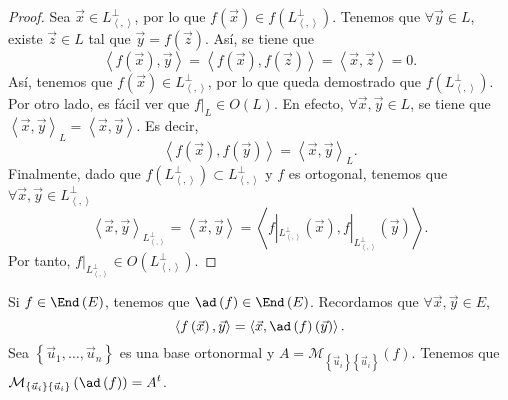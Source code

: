 \begin{proof}
Sea $\displaystyle \vec{x} \in L^{\perp }_{\left\langle ,  \right\rangle } $, por lo que $\displaystyle f\left(\vec{x}\right) \in f\left(L^{\perp }_{\left\langle ,  \right\rangle }\right) $. Tenemos que $\displaystyle \forall\vec{y} \in L $, existe $\displaystyle \vec{z} \in L $ tal que $\displaystyle \vec{y} = f\left(\vec{z}\right) $. Así, se tiene que 
\[\left\langle f\left(\vec{x}\right), \vec{y} \right\rangle = \left\langle f\left(\vec{x}\right), f\left(\vec{z}\right) \right\rangle = \left\langle \vec{x}, \vec{z} \right\rangle = 0 .\]
Así, tenemos que $\displaystyle f\left(\vec{x}\right) \in L^{\perp }_{\left\langle ,  \right\rangle } $, por lo que queda demostrado que $\displaystyle f\left(L^{\perp }_{\left\langle ,  \right\rangle }\right) $. \\
Por otro lado, es fácil ver que $\displaystyle f|_{L} \in O\left(L\right) $. En efecto, $\displaystyle \forall \vec{x}, \vec{y} \in L $, se tiene que $\displaystyle \left\langle \vec{x}, \vec{y} \right\rangle _{L} = \left\langle \vec{x}, \vec{y} \right\rangle  $. Es decir,
\[\left\langle f\left(\vec{x}\right), f\left(\vec{y}\right) \right\rangle = \left\langle \vec{x}, \vec{y} \right\rangle _{L} .\]
Finalmente, dado que $\displaystyle f\left(L^{\perp }_{\left\langle ,  \right\rangle }\right) \subset L^{\perp }_{\left\langle ,  \right\rangle } $ y $\displaystyle f $ es ortogonal, tenemos que $\displaystyle \forall\vec{x}, \vec{y} \in L^{\perp }_{\left\langle ,  \right\rangle } $ 
\[\left\langle \vec{x}, \vec{y} \right\rangle _{L^{\perp }_{\left\langle ,  \right\rangle }} = \left\langle \vec{x}, \vec{y} \right\rangle = \left\langle f|_{L^{\perp }_{\left\langle ,  \right\rangle }}\left(\vec{x}\right), f|_{L^{\perp }_{\left\langle ,  \right\rangle }}\left(\vec{y}\right) \right\rangle  .\]
Por tanto, $\displaystyle f|_{L^{\perp }_{\left\langle ,  \right\rangle }} \in O\left(L^{\perp }_{\left\langle ,  \right\rangle }\right) $.
\end{proof}
Si $\displaystyle f \in \End\left(E\right) $, tenemos que $\displaystyle \ad\left(f\right) \in \End\left(E\right) $. Recordamos que $\displaystyle \forall \vec{x}, \vec{y} \in E $,
\[\left\langle f\left(\vec{x}\right), \vec{y} \right\rangle  = \left\langle \vec{x}, \ad\left(f\right)\left(\vec{y}\right) \right\rangle  .\]
Sea $\displaystyle \left\{ \vec{u}_{1}, \ldots, \vec{u}_{n}\right\}  $ es una base ortonormal y $\displaystyle A = \mathcal{M}_{ \left\{ \vec{u}_{i}\right\} \left\{ \vec{u}_{i}\right\} }\left(f\right) $. Tenemos que $\displaystyle \mathcal{M}_{ \left\{ \vec{u}_{i}\right\} \left\{ \vec{u}_{i}\right\} }\left(\ad\left(f\right)\right) = A^{t} $.
